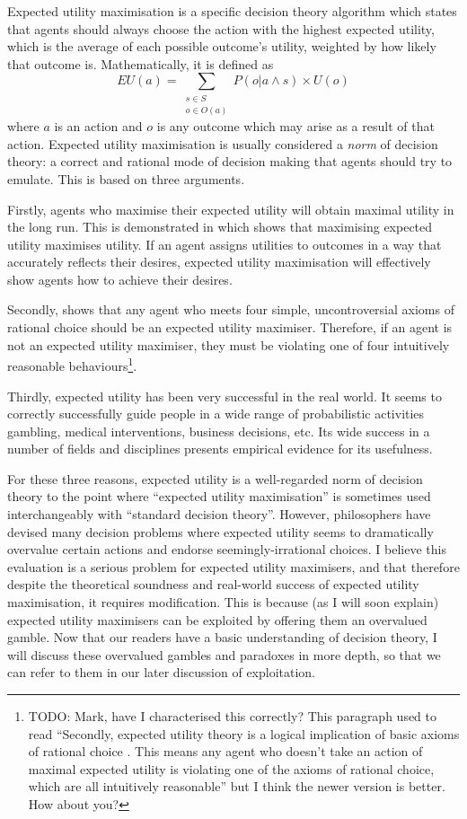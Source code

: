 \documentclass{article}
\begin{document}
Expected utility maximisation is a specific decision theory algorithm which states that agents should always choose the action with the highest expected utility, which is the average of each possible outcome's utility, weighted by how likely that outcome is. Mathematically, it is defined as
\[EU(a)=\sum_{\substack{s\in S \\ o \in O(a)}}P(o|a \wedge s)\times U(o)\]
where \(a\) is an action and \(o\) is any outcome which may arise as a result of that action. Expected utility maximisation is usually considered a \textit{norm} of decision theory: a correct and rational mode of decision making that agents should try to emulate. This is based on three arguments.

Firstly, agents who maximise their expected utility will obtain maximal utility in the long run. This is demonstrated in \citep{von1944games} which shows that maximising expected utility maximises utility. If an agent assigns utilities to outcomes in a way that accurately reflects their desires, expected utility maximisation will effectively show agents how to achieve their desires. 

Secondly, \citep{von1944games} shows that any agent who meets four simple, uncontroversial axioms of rational choice should be an expected utility maximiser. Therefore, if an agent is not an expected utility maximiser, they must be violating one of four intuitively reasonable behaviours\footnote{TODO: Mark, have I characterised this correctly? This paragraph used to read ``Secondly, expected utility theory is a logical implication of basic axioms of rational choice \citep{von1944games}. This means any agent who doesn't take an action of maximal expected utility is violating one of the axioms of rational choice, which are all intuitively reasonable'' but I think the newer version is better. How about you?}. 

Thirdly, expected utility has been very successful in the real world. It seems to correctly successfully guide people in a wide range of probabilistic activities \textemdash{} gambling, medical interventions, business decisions, etc. Its wide success in a number of fields and disciplines presents empirical evidence for its usefulness.

For these three reasons, expected utility is a well-regarded norm of decision theory \textemdash{} to the point where ``expected utility maximisation'' is sometimes used interchangeably with ``standard decision theory''. However, philosophers have devised many decision problems where expected utility seems to dramatically overvalue certain actions and endorse seemingly-irrational choices. I believe this evaluation is a serious problem for expected utility maximisers, and that therefore despite the theoretical soundness and real-world success of expected utility maximisation, it requires modification. This is because (as I will soon explain) expected utility maximisers can be exploited by offering them an overvalued gamble. Now that our readers have a basic understanding of decision theory, I will discuss these overvalued gambles and paradoxes in more depth, so that we can refer to them in our later discussion of exploitation.
\end{document}
